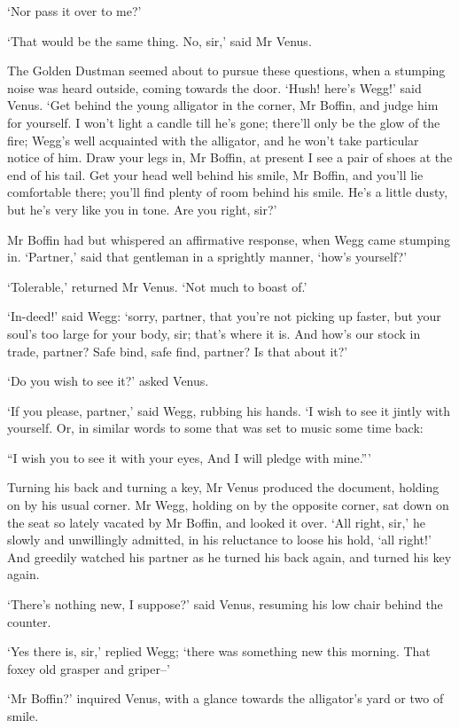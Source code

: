 ‘Nor pass it over to me?’

‘That would be the same thing. No, sir,’ said Mr Venus.

The Golden Dustman seemed about to pursue these questions, when a
stumping noise was heard outside, coming towards the door. ‘Hush! here’s
Wegg!’ said Venus. ‘Get behind the young alligator in the corner, Mr
Boffin, and judge him for yourself. I won’t light a candle till he’s
gone; there’ll only be the glow of the fire; Wegg’s well acquainted with
the alligator, and he won’t take particular notice of him. Draw your
legs in, Mr Boffin, at present I see a pair of shoes at the end of his
tail. Get your head well behind his smile, Mr Boffin, and you’ll lie
comfortable there; you’ll find plenty of room behind his smile. He’s a
little dusty, but he’s very like you in tone. Are you right, sir?’

Mr Boffin had but whispered an affirmative response, when Wegg came
stumping in. ‘Partner,’ said that gentleman in a sprightly manner,
‘how’s yourself?’

‘Tolerable,’ returned Mr Venus. ‘Not much to boast of.’

‘In-deed!’ said Wegg: ‘sorry, partner, that you’re not picking up
faster, but your soul’s too large for your body, sir; that’s where
it is. And how’s our stock in trade, partner? Safe bind, safe find,
partner? Is that about it?’

‘Do you wish to see it?’ asked Venus.

‘If you please, partner,’ said Wegg, rubbing his hands. ‘I wish to see
it jintly with yourself. Or, in similar words to some that was set to
music some time back:

     “I wish you to see it with your eyes,
     And I will pledge with mine.”’

Turning his back and turning a key, Mr Venus produced the document,
holding on by his usual corner. Mr Wegg, holding on by the opposite
corner, sat down on the seat so lately vacated by Mr Boffin, and looked
it over. ‘All right, sir,’ he slowly and unwillingly admitted, in his
reluctance to loose his hold, ‘all right!’ And greedily watched his
partner as he turned his back again, and turned his key again.

‘There’s nothing new, I suppose?’ said Venus, resuming his low chair
behind the counter.

‘Yes there is, sir,’ replied Wegg; ‘there was something new this
morning. That foxey old grasper and griper--’

‘Mr Boffin?’ inquired Venus, with a glance towards the alligator’s yard
or two of smile.

